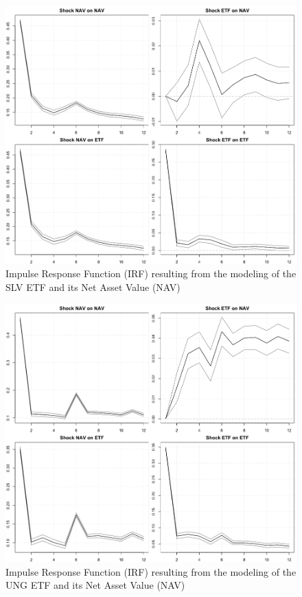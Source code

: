 \begin{landscape}
\begin{figure}[t]
\includegraphics[width=16cm]{SLV_irf.png}
\centering
\caption{Impulse Response Function (IRF) resulting from the modeling of the SLV ETF and its Net Asset Value (NAV)}
\label{fig:irf3}
\end{figure}
\end{landscape}

\begin{landscape}
\begin{figure}[t]
\includegraphics[width=16cm]{UNG_irf.png}
\centering
\caption{Impulse Response Function (IRF) resulting from the modeling of the UNG ETF and its Net Asset Value (NAV)}
\label{fig:irf4}
\end{figure}
\end{landscape}
